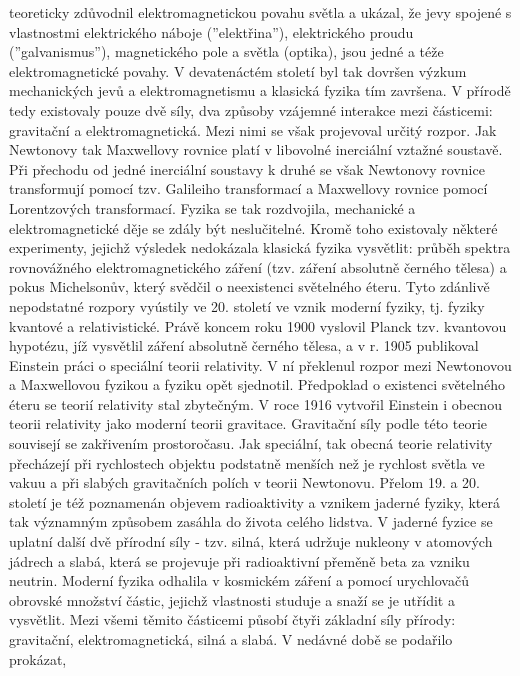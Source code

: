     teoreticky zdůvodnil elektromagnetickou povahu světla a ukázal, že jevy spojené s vlastnostmi
    elektrického náboje (”elektřina”), elektrického proudu (”galvanismus”), magnetického pole a
    světla (optika), jsou jedné a téže elektromagnetické povahy. V devatenáctém století byl tak
    dovršen výzkum mechanických jevů a elektromagnetismu a klasická fyzika tím za\-vršena. V přírodě
    tedy existovaly pouze dvě síly, dva způsoby vzájemné interakce mezi částicemi: gravitační a
    elektromagnetická. Mezi nimi se však projevoval určitý rozpor. Jak Newtonovy tak Maxwellovy
    rovnice platí v libovolné inerciální vztažné soustavě. Při přechodu od jedné inerciální soustavy
    k druhé se však Newtonovy rovnice transformují pomocí tzv. Galileiho transformací a Maxwellovy
    rovnice pomocí Lorentzových transformací. Fyzika se tak rozdvojila, mechanické a
    elektromagnetické děje se zdály být neslučitelné. Kromě toho existovaly některé experimenty,
    jejichž výsledek nedokázala klasická fyzika vysvětlit: průběh spektra rovnovážného
    elektromagnetického záření (tzv. záření absolutně černého tělesa) a pokus Michelsonův, který
    svědčil o neexistenci světelného éteru. Tyto zdánlivě nepodstatné rozpory vyústily ve 20.
    století ve vznik moderní fyziky, tj. fyziky kvantové a relativistické. Právě koncem roku 1900
    vyslovil Planck tzv. kvantovou hypotézu, jíž vysvětlil záření absolutně černého tělesa, a v r.
    1905 publikoval Einstein práci o speciální teorii relativity. V ní překlenul rozpor mezi
    Newtonovou a Maxwellovou fyzikou a fyziku opět sjednotil. Předpoklad o existenci světelného
    éteru se teorií relativity stal zbytečným. V roce 1916 vytvořil Einstein i obecnou teorii
    relativity jako moderní teorii gravitace. Gravitační síly podle této teorie souvisejí se
    zakřivením prostoročasu. Jak speciální, tak obecná teorie relativity přecházejí při rychlostech
    objektu podstatně menších než je rychlost světla ve vakuu a při slabých gravitačních polích v
    teorii Newtonovu. Přelom 19. a 20. století je též poznamenán objevem radioaktivity a vznikem
    jaderné fyziky, která tak významným způsobem zasáhla do života celého lidstva. V jaderné fyzice
    se uplatní další dvě přírodní síly - tzv. silná, která udržuje nukleony v atomových jádrech a
    slabá, která se projevuje při radioaktivní přeměně beta za vzniku neutrin. Moderní fyzika
    odhalila v kosmickém záření a pomocí urychlovačů obrovské množství částic, jejichž vlastnosti
    studuje a snaží se je utřídit a vysvětlit. Mezi všemi těmito částicemi působí čtyři základní
    síly přírody: gravitační, elektromagnetická, silná a slabá. V nedávné době se podařilo prokázat,
